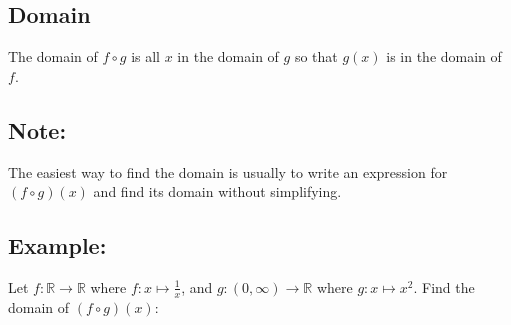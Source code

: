 \documentclass[20pt]{extarticle}
\newcommand{\LP}{\left(}
\newcommand{\RP}{\right)}
\newcommand{\R}{\mathbb{R}}
\begin{document}
\subsection*{\textbf{\color{draculaorange}Domain}}
The domain of $f\circ g$ is all $x$ in the domain of $g$ so that $g(x)$ is in the domain of $f$.
\vskip8cm


\subsection*{\textbf{\color{draculacyan}Note:}}
The easiest way to find the domain is usually to write an expression for $(f\circ g)(x)$ and find its domain without simplifying.




\newpage

\subsection*{\textbf{\color{draculared}Example:}}
Let \(f:\R\to\R\) where \(f:x\mapsto \frac{1}{x}\), and
\(g:\LP 0,\infty\RP\to \R\) where \(g:x\mapsto x^2\).
\vskip4cm
Find the domain of \(\LP f\circ g\RP(x)\):


\newpage
\end{document}
